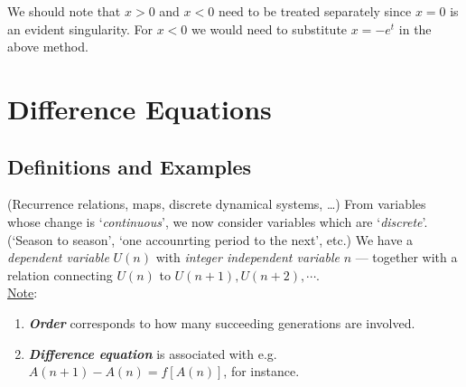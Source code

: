 \documentclass[12pt]{report}
\theoremstyle{definition}
\begin{document}
We should note that $x > 0$ and $x < 0$ need to be treated separately since $x = 0$ is an evident singularity.
For $x< 0$ we would need to substitute $x = -e^{t}$ in the above method.


\section{Difference Equations}

\subsection{Definitions and Examples}

(Recurrence relations, maps, discrete dynamical systems, \ldots)
From variables whose change is `\emph{continuous}', we now consider variables which are `\emph{discrete}'.
(`Season to season', `one accounrting period to the next', etc.)
We have a \emph{dependent variable} $U(n)$ with \emph{integer independent variable} $n$
--- together with a relation connecting $U(n)$ to $U(n + 1), U(n + 2), \cdots$.
\medskip
\\\underline{Note}:

\begin{enumerate}[label = (\roman*)]
    \item \textbf{\emph{Order}} corresponds to how many succeeding generations are involved.

    \item \textbf{\emph{Difference equation}} is associated with e.g. $A(n+1) - A(n) = f[A(n)]$, for instance.
\end{enumerate}
\end{document}
